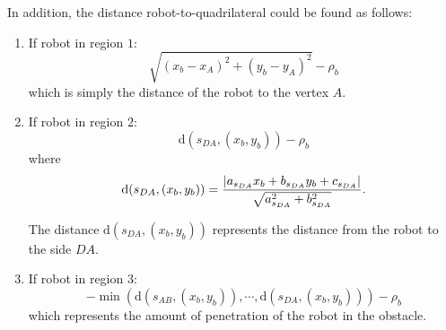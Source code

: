 \documentclass[eprint]{actapoly}
\begin{document}
\begin{enumerate}
    In addition, the distance
    robot-to-quadrilateral could be found as follows:
    \begin{enumerate}
    
	   	\item If robot in region $1$:
   	   	\begin{equation*}
    	    \sqrt{(x_{b} - x_{A})^2 + (y_{b} - y_{A})^2} - \rho_b
	    \end{equation*}
	    which is simply the distance of the robot to the vertex $A$.
	    
	    \item If robot in region $2$:
%	    
		\begin{equation*}
			\mathrm{d}(s_{DA}, (x_{b}, y_{b})) - \rho_b
		\end{equation*}
		where
   	   	\begin{equation*}
    	    \mathrm{d}(s_{DA}, (x_{b}, y_{b})) =\\ \frac{|a_{s_{DA}}x_{b} + b_{s_{DA}}y_{b}
    	    + c_{s_{DA}}|}{\sqrt{a_{s_{DA}}^2 + b_{s_{DA}}^2}}.
	    \end{equation*}
	    
	    The distance $\mathrm{d}(s_{DA}, (x_{b}, y_{b}))$ represents the distance from the robot to the side $DA$.
	    
	    \item If robot in region $3$:
   	   	\begin{equation*}
    	    -\min\left(\mathrm{d}(s_{AB}, (x_{b}, y_{b})), \cdots, \mathrm{d}(s_{DA}, (x_{b}, y_{b}))\right) - \rho_b
	    \end{equation*}
	    which represents the amount of penetration of the robot in the obstacle.
	    
    \end{enumerate}
    
    
    \begin{figure}[!h]
	\centering
	{
	    }
\end{figure}
\end{enumerate}
\end{document}
